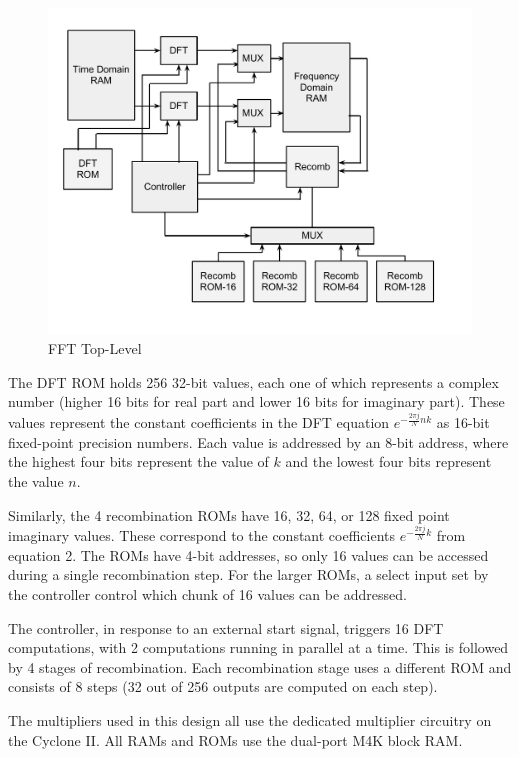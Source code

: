 \documentclass{article}
\begin{document}
\begin{figure}[H]
	\centering
	\includegraphics[scale=0.35]{fft-top}
	\caption{FFT Top-Level}
\end{figure}

The DFT ROM holds 256 32-bit values, each one of which represents a
complex number (higher 16 bits for real part and lower 16 bits for
imaginary part). These values represent the constant coefficients
in the DFT equation \(e^{-\frac{2\pi j}{N} n k}\) as 16-bit fixed-point
precision numbers. Each value is addressed by an 8-bit address, where
the highest four bits represent the value of \(k\) and the lowest four bits
represent the value \(n\).

Similarly, the 4 recombination ROMs have 16, 32, 64, or 128 fixed point
imaginary values. These correspond to the constant coefficients
\(e^{-\frac{2\pi j}{N}k}\) from equation 2. The ROMs have 4-bit addresses, 
so only 16 values can be accessed during a single recombination step. 
For the larger ROMs, a select input set by the controller control which 
chunk of 16 values can be addressed.

The controller, in response to an external start signal, triggers
16 DFT computations, with 2 computations running in parallel at a time.
This is followed by 4 stages of recombination. Each recombination stage
uses a different ROM and consists of 8 steps (32 out of 256 outputs are
computed on each step).

The multipliers used in this design all use the dedicated multiplier 
circuitry on the Cyclone II. All RAMs and ROMs use the dual-port M4K
block RAM.
	
\end{document}
